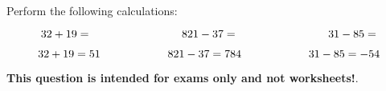 

Perform the following calculations:

$$32 + 19 = \hbox{\hskip 80pt} 821 - 37 = \hbox{\hskip 80pt} 31 - 85 = $$







$$32 + 19 = 51 \hbox{\hskip 60pt} 821 - 37 = 784 \hbox{\hskip 60pt} 31 - 85 = -54$$







{\bf This question is intended for exams only and not worksheets!}.




